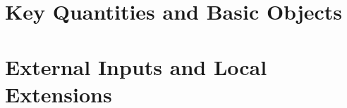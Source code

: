 \chapter{Key Quantities and Basic Objects}\label{sec:key-quantities}



\clearpage

% 

\chapter{External Inputs and Local Extensions}\label{sec:external-inputs}


